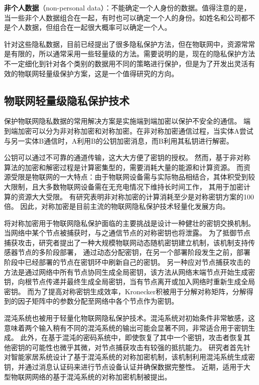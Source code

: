 \textcolor{myblue}{\textbf{非个人数据}}（non-personal data）：不能确定一个人身份的数据。值得注意的是，当一些非个人数据组合在一起，有时也可以确定一个人的身份。如姓名和公司都不是个人数据，但组合在一起很大概率可以确定一个人。

针对这些隐私数据，目前已经提出了很多隐私保护方法，但在物联网中，资源常常是有限的，所以通常采用一些轻量级的方法。需要说明的是，现在的隐私保护方法不一定细化到针对各个类别的数据用不同的策略进行保护，但是为了开发出灵活有效的物联网轻量级保护方案，这是一个值得研究的方向。

 
 
\subsection{物联网轻量级隐私保护技术}
保护物联网隐私数据的常用解决方案是实施端到端加密以保护不安全的通信。
端到端加密可以分为非对称加密和对称加密。在非对称加密通信过程，当实体A尝试与另一实体B通信时，A利用B的公钥加密消息，而B利用其私钥进行解密。

公钥可以通过不可靠的通道传输，这大大方便了密钥的授权。
然而，基于非对称算法的加密和解密过程是计算密集型的，需要消耗大量的能源和计算资源\cite{luo}。
而资源受限是物联网的一大特点：由于物联网设备需与实际物品相结合，其体积受到较大限制，且大多数物联网设备需在无充电情况下维持长时间工作，
其用于加密计算的资源大大受限。
有研究表明非对称加密的计算消耗至少是对称密钥方案的100倍\cite{hirani}。
因此，对称加密是目前主流的物联网隐私保护技术轻量化发展方向。 


将对称加密用于物联网隐私保护面临的主要挑战是设计一种健壮的密钥交换机制。
当网络中某个节点被捕获时，与之通信节点的对称密钥也将泄露。
为了抵御节点捕获攻击，研究者提出了一种大规模物联网动态随机密钥建立机制，该机制支持传感器节点的多阶段部署，
通过动态分配密钥，在另一个部署阶段发生之前，部署阶段中已经部署的节点在密钥环中刷新自己的密钥\cite{das}。
另一种应对节点捕获攻击的方法是通过网络中所有节点协同生成全局密钥，该方法从网络末端节点开始生成密钥，向根节点传递并最终生成全局密钥，当有节点离开或加入网络时重新生成全局密钥\cite{hendaoui}。
而为了提高对称密钥生成效率，Kronecker积被用于分解对称矩阵，分解得到的因子矩阵中的参数分配至网络中各个节点作为密钥\cite{tsai}。


混沌系统也被用于轻量化物联网隐私保护技术。混沌系统对初始条件非常敏感，这意味着两个输入稍有不同的混沌系统的输出可能会显著不同，非常适合用于密钥生成。
此外，在基于混沌的密码系统中，即使恢复了其中一个密钥，攻击者恢复其他密钥的可能性也微乎其微，对节点捕获攻击有较强的抵抗能力。
研究者首先针对智能家居系统设计了基于混沌系统的对称加密机制，该机制利用混沌系统生成密钥，并通过消息认证码来进行节点设备认证并确保数据完整性\cite{song}。
近期，适用于大型物联网网络的基于混沌系统的对称加密机制被提出。

